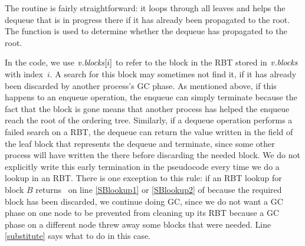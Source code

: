 The  routine is fairly straightforward:  it loops through all leaves and
helps the dequeue that is in progress there if it has already been propagated to the root.
The  function is used to determine whether the dequeue has propagated to the root.

In the code, we use $\mbox{\textnormal{\textit{v}}}.\mbox{\textit{blocks}}[i]$ to refer to the block in the RBT stored in $\mbox{\textnormal{\textit{v}}}.\mbox{\textit{blocks}}$
with index~$i$.
A search for this block may sometimes not find it, if it has already been discarded
by another process's GC phase.
As mentioned above, if this happens to an enqueue operation,
the enqueue can simply terminate because the fact that the block is gone means that another
process has helped the enqueue reach the root of the ordering tree.
Similarly, if  a dequeue operation performs a failed search on a RBT, the dequeue can return the value 
written in the  field of the 
leaf block that represents the dequeue and terminate, since some other process
will have written the  there before discarding the needed block.
We do not explicitly write this early termination in the pseudocode every time we do a lookup in an RBT.
There is one exception to this rule:  if an RBT lookup for block $B$ returns \nl\
on line \ref{SBlookup1} or \ref{SBlookup2} of
 because the required block has been discarded, 
we continue doing GC, since we do not want a GC phase on one node
to be prevented from cleaning up its RBT because a GC phase on a different node threw away some blocks
that were needed.
Line \ref{substitute} says what to do in this case.

